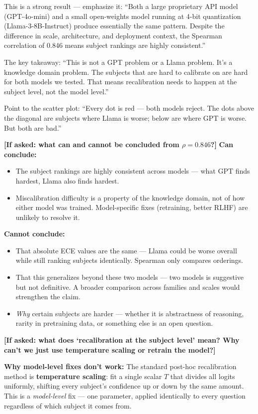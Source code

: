 \documentclass[aspectratio=169,11pt]{beamer}
\begin{document}
{  This is a strong result — emphasize it: ``Both a large proprietary API model
  (GPT-4o-mini) and a small open-weights model running at 4-bit quantization
  (Llama-3-8B-Instruct) produce essentially the same pattern. Despite the difference
  in scale, architecture, and deployment context, the Spearman correlation of 0.846
  means subject rankings are highly consistent.''

  The key takeaway: ``This is not a GPT problem or a Llama problem. It's a knowledge
  domain problem. The subjects that are hard to calibrate on are hard for both models we tested.
  That means recalibration needs to happen at the subject level,
  not the model level.''

  Point to the scatter plot: ``Every dot is red — both models reject. The dots above
  the diagonal are subjects where Llama is worse; below are where GPT is worse. But
  both are bad.''

  \textbf{[If asked: what can and cannot be concluded from $\rho = 0.846$?]}
  \textbf{Can conclude:}
  \begin{itemize}
    \item The subject rankings are highly consistent across models --- what GPT finds
      hardest, Llama also finds hardest.
    \item Miscalibration difficulty is a property of the knowledge domain, not of
      how either model was trained. Model-specific fixes (retraining, better RLHF)
      are unlikely to resolve it.
  \end{itemize}
  \textbf{Cannot conclude:}
  \begin{itemize}
    \item That absolute ECE values are the same --- Llama could be worse overall
      while still ranking subjects identically. Spearman only compares orderings.
    \item That this generalizes beyond these two models --- two models is suggestive
      but not definitive. A broader comparison across families and scales would
      strengthen the claim.
    \item \emph{Why} certain subjects are harder --- whether it is abstractness of
      reasoning, rarity in pretraining data, or something else is an open question.
  \end{itemize}

  \textbf{[If asked: what does `recalibration at the subject level' mean?
  Why can't we just use temperature scaling or retrain the model?]}

  \textbf{Why model-level fixes don't work:}
  The standard post-hoc recalibration method is \textbf{temperature scaling}: fit
  a single scalar $T$ that divides all logits uniformly, shifting every subject's
  confidence up or down by the same amount. This is a \emph{model-level} fix ---
  one parameter, applied identically to every question regardless of which subject
  it comes from.

}
\end{document}
